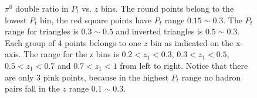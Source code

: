  \begin{figure}[H]
  \centering     
\caption{$\pi^0$ double ratio in $P_t$ vs. $z$ bins. The round points belong to the lowest $P_t$ bin, the red square points have $P_t$ range $0.15\sim 0.3$. The $P_t$ range for triangles is $0.3\sim 0.5$ and inverted triangles is $0.5\sim0.3$. Each group of 4 points belongs to one $z$ bin as indicated on the x-axis. The range for the z bins is $0.2<z_1<0.3$,  $0.3<z_1<0.5$, $0.5<z_1<0.7$ and $0.7<z_1<1$ from left to right. Notice that there are only 3 pink points, because in the highest $P_t$ range no hadron pairs fall in the $z$ range $0.1\sim 0.3$.}
  \label{fig:ptzresult}
\end{figure}
